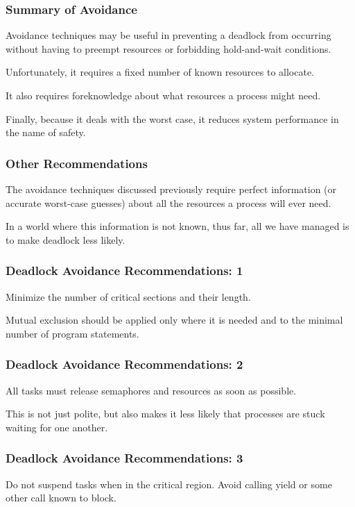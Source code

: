 \begin{frame}
\frametitle{Summary of Avoidance}

Avoidance techniques may be useful in preventing a deadlock from occurring without having to preempt resources or forbidding hold-and-wait conditions. 

Unfortunately, it requires a fixed number of known resources to allocate.

It also requires foreknowledge about what resources a process might need. 

Finally, because it deals with the worst case, it reduces system performance in the name of safety.

\end{frame}

\begin{frame}
\frametitle{Other Recommendations}

The avoidance techniques discussed previously require perfect information (or accurate worst-case guesses) about all the resources a process will ever need. 

In a world where this information is not known, thus far, all we have managed is to make deadlock less likely. 

\end{frame}

\begin{frame}
\frametitle{Deadlock Avoidance Recommendations: 1}
Minimize the number of critical sections and their length.

Mutual exclusion should be applied only where it is needed and to the minimal number of program statements.

\end{frame}

\begin{frame}
\frametitle{Deadlock Avoidance Recommendations: 2}

All tasks must release semaphores and resources as soon as possible.

This is not just polite, but also makes it less likely that processes are stuck waiting for one another.

\end{frame}

\begin{frame}
\frametitle{Deadlock Avoidance Recommendations: 3}

Do not suspend tasks when in the critical region. Avoid calling yield or some other call known to block.

\end{frame}

